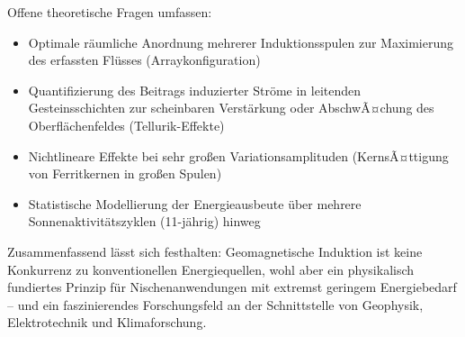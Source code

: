﻿\documentclass[a4paper,12pt]{article}
\theoremstyle{definition}
\begin{document}
Offene theoretische Fragen umfassen:
\begin{itemize}
    \item Optimale r\"aumliche Anordnung mehrerer Induktionsspulen
          zur Maximierung des erfassten Fl\"usses (Arraykonfiguration)
    \item Quantifizierung des Beitrags induzierter Str\"ome in leitenden
          Gesteinsschichten zur scheinbaren Verst\"arkung oder AbschwÃ¤chung
          des Oberfl\"achenfeldes (Tellurik-Effekte)
    \item Nichtlineare Effekte bei sehr gro{\ss}en Variationsamplituden
          (KernsÃ¤ttigung von Ferritkernen in gro{\ss}en Spulen)
    \item Statistische Modellierung der Energieausbeute \"uber mehrere
          Sonnenaktivit\"atszyklen (11-j\"ahrig) hinweg
\end{itemize}

Zusammenfassend l\"asst sich festhalten: Geomagnetische Induktion
ist keine Konkurrenz zu konventionellen Energiequellen, wohl aber
ein physikalisch fundiertes Prinzip f\"ur Nischenanwendungen mit
extremst geringem Energiebedarf -- und ein faszinierendes Forschungsfeld
an der Schnittstelle von Geophysik, Elektrotechnik und Klimaforschung.
\end{document}

